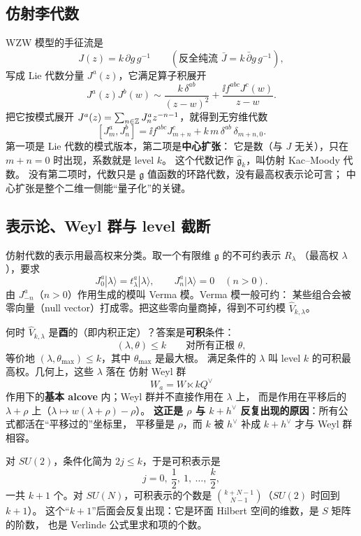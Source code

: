 \subsection{仿射李代数}

WZW 模型的手征流是
\[
J(z)=k\,\partial g\,g^{-1}\qquad(\text{反全纯流 } \bar J=k\,\bar\partial g\,g^{-1}),
\]
写成 Lie 代数分量 $J^a(z)$，它满足算子积展开
\begin{equation}
J^a(z)J^b(w)\sim\frac{k\,\delta^{ab}}{(z-w)^2}+\frac{\ii f^{abc}J^c(w)}{z-w}. \tag{6.1}
\end{equation}
把它按模式展开 $J^a(z)=\sum_{n\in\mathbb{Z}}J^a_n z^{-n-1}$，就得到无穷维代数
\[
[J^a_m,J^b_n]=\ii f^{abc}J^c_{m+n}+k\,m\,\delta^{ab}\,\delta_{m+n,0}.
\]
第一项是 Lie 代数的模式版本，第二项是\textbf{中心扩张}：
它是数（与 $J$ 无关），只在 $m+n=0$ 时出现，系数就是 level $k$。
这个代数记作 $\hat{\mathfrak g}_k$，叫仿射 Kac--Moody 代数。
没有第二项时，代数只是 $\mathfrak g$ 值函数的环路代数，没有最高权表示论可言；
中心扩张是整个二维一侧能“量子化”的关键。

\subsection{表示论、Weyl 群与 level 截断}

仿射代数的表示用最高权来分类。取一个有限维 $\mathfrak g$ 的不可约表示 $R_\lambda$
（最高权 $\lambda$），要求
\[
J^a_0|\lambda\rangle=t^a_\lambda|\lambda\rangle,
\qquad J^a_n|\lambda\rangle=0\quad(n>0).
\]
由 $J^a_{-n}$（$n>0$）作用生成的模叫 Verma 模。Verma 模一般可约：
某些组合会被零向量（null vector）打成零。把这些零向量商掉，得到不可约模
$\hat V_{k,\lambda}$。

何时 $\hat V_{k,\lambda}$ 是\textbf{酉}的（即内积正定）？答案是\textbf{可积}条件：
\[
(\lambda,\theta)\le k
\qquad\text{对所有正根 }\theta ,
\]
等价地 $(\lambda,\theta_{\max})\le k$，其中 $\theta_{\max}$ 是最大根。
满足条件的 $\lambda$ 叫 level $k$ 的可积最高权。几何上，这些 $\lambda$ 落在
仿射 Weyl 群
\[
W_a=W\ltimes kQ^\vee
\]
作用下的\textbf{基本 alcove} 内；Weyl 群并不直接作用在 $\lambda$ 上，
而是作用在平移后的 $\lambda+\rho$ 上（$\lambda\mapsto w(\lambda+\rho)-\rho$）。
\textbf{这正是 $\rho$ 与 $k+h^\vee$ 反复出现的原因}：所有公式都活在“平移过的”坐标里，
平移量是 $\rho$，而 $k$ 被 $h^\vee$ 补成 $k+h^\vee$ 才与 Weyl 群相容。

对 $SU(2)$，条件化简为 $2j\le k$，于是可积表示是
\[
j=0,\ \frac12,\ 1,\ \dots,\ \frac k2,
\]
一共 $k+1$ 个。对 $SU(N)$，可积表示的个数是
$\binom{k+N-1}{N-1}$（$SU(2)$ 时回到 $k+1$）。
这个“$k+1$”后面会反复出现：它是环面 Hilbert 空间的维数，是 $S$ 矩阵的阶数，
也是 Verlinde 公式里求和项的个数。

